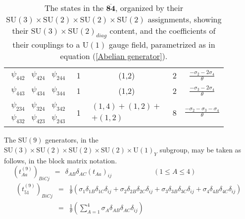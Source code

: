 \documentclass[a4paper,12pt,oneside]{article}
\begin{document}
\begin{table}
\begin{center}
\begin{tabular}{|c|c|c|c|c|}
$\begin{array}{ccc} \psi_{442} & \psi_{424} & \psi_{244} \end{array}$ & 1 & (1,2) & 2 & $\frac{-\sigma_2-2\sigma_4}{\theta}$ \\ 
$\begin{array}{ccc} \psi_{443} & \psi_{434} & \psi_{344} \end{array}$ & 1 & (1,2) & 2 & $\frac{-\sigma_3-2\sigma_4}{\theta}$ \\ \hline
$\begin{array}{ccc}
\psi_{234} & \psi_{324} & \psi_{342} \\
\psi_{432} & \psi_{423} & \psi_{243}
\end{array}$ & 1 &
$\begin{array}{c} (1,4)+(1,2)+ \\ +(1,2)\end{array}$ & 8 & 
$\frac{-\sigma_2-\sigma_3-\sigma_4}{\theta}$ \\ \hline
\end{tabular}
\caption{\label{T3}
The states in the $\mathbf{\overline{84}}$, organized by their
$\mathrm{SU}(3)\times\mathrm{SU}(2)\times\mathrm{SU}(2)\times
\mathrm{SU}(2)$ assignments, showing their $\mathrm{SU}(3)\times
\mathrm{SU}(2)_{diag}$ content, and the coefficients of
their couplings to a $\mathrm{U}(1)$ gauge field, parametrized as in equation
(\ref{Abelian generator}).}
\end{center}
\end{table}

The $\mathrm{SU}(9)$ generators, in the $\mathrm{SU}(3)\times
\mathrm{SU}(2)\times\mathrm{SU}(2)\times\mathrm{SU}(2)\times
\mathrm{U}(1)_Y$ subgroup, may be taken as follows, in the block 
matrix notation.
\begin{equation}\label{non-Abelian generators}
\left(t_{Aa}^{(9)}\right)_{BiCj}\ \ =\ \ \delta_{AB}\delta_{AC}
\left(t_{Aa}\right)_{ij}\qquad\qquad\qquad(1\leq A\leq4)
\qquad\qquad\qquad\quad
\end{equation}
\begin{equation}\label{Abelian generator}
\begin{array}{ccl}
\left(t_{51}^{(9)}\right)_{BiCj} & = & \frac{1}{\theta}\left(
\sigma_1\delta_{1B}\delta_{1C}\delta_{ij}+
\sigma_2\delta_{2B}\delta_{2C}\delta_{ij}+
\sigma_3\delta_{3B}\delta_{3C}\delta_{ij}+
\sigma_4\delta_{4B}\delta_{4C}\delta_{ij}\right) \\
 & = & \frac{1}{\theta}
\left(\displaystyle\sum_{A=1}^4\sigma_A\delta_{AB}\delta_{AC}
\delta_{ij}\right)
\end{array}
\end{equation}
\end{document}
